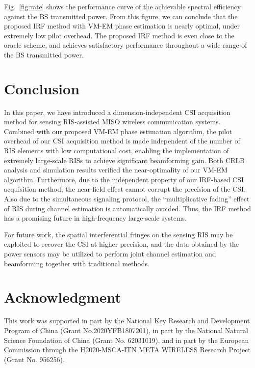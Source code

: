 \documentclass[conference,10pt,twocolumn]{IEEEtran}
\theoremstyle{nonumberplain}
\begin{document}
    Fig.~\ref{fig:rate} shows the performance curve of the achievable spectral efficiency against the BS transmitted power. From this figure, we can conclude that the proposed IRF method with VM-EM phase estimation is nearly optimal, under extremely low pilot overhead. The proposed IRF method is even close to the oracle scheme, and achieves satisfactory performance throughout a wide range of the BS transmitted power. 


\section{Conclusion}
\label{Conclusion}
    In this paper, we have introduced a dimension-independent CSI acquisition method for sensing RIS-assisted MISO wireless communication systems. 
    Combined with our proposed VM-EM phase estimation algorithm, the pilot overhead of our CSI acquisition method is made independent of the number of RIS elements with low computational cost, enabling the implementation of extremely large-scale RISs to achieve significant beamforming gain. 
    Both CRLB analysis and simulation results verified the near-optimality of our VM-EM algorithm. 
    Furthermore, due to the independent property of our \ac{IRF}-based CSI acquisition method, the near-field effect cannot corrupt the precision of the CSI. 
    Also due to the simultaneous signaling protocol, the “multiplicative fading” effect of RIS \cite{zhang2021active,liu2021active} during channel estimation is automatically avoided. 
    Thus, the \ac{IRF} method has a promising future in high-frequency large-scale systems. 
    
    For future work, the spatial interferential fringes on the sensing RIS may be exploited to recover the CSI at higher precision, and the data obtained by the power sensors may be utilized to perform joint channel estimation and beamforming together with traditional methods. 

\appendices

\section*{Acknowledgment}
    This work was supported in part by the National Key Research and Development Program of China (Grant No.2020YFB1807201), in part by the National Natural Science Foundation of China (Grant No. 62031019), and in part by the European Commission through the H2020-MSCA-ITN META WIRELESS Research Project (Grant No. 956256).

\footnotesize
\balance 


\end{document}
